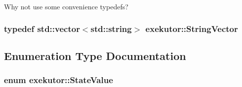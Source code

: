\-Why not use some convenience typedefs? 

\hypertarget{namespaceexekutor_a58d8a9cd227883a8eacb6400c9f62acb}{
\subsubsection[{\-String\-Vector}]{\setlength{\rightskip}{0pt plus 5cm}typedef std\-::vector$<$std\-::string$>$ {\bf exekutor\-::\-String\-Vector}}}\label{namespaceexekutor_a58d8a9cd227883a8eacb6400c9f62acb}


\subsection{\-Enumeration \-Type \-Documentation}
\hypertarget{namespaceexekutor_a82e43e24945d434a81cc5d50282a0e6d}{
\subsubsection[{\-State\-Value}]{\setlength{\rightskip}{0pt plus 5cm}enum {\bf exekutor\-::\-State\-Value}}}\label{namespaceexekutor_a82e43e24945d434a81cc5d50282a0e6d}
